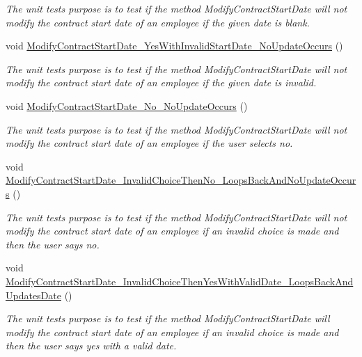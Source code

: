 \begin{DoxyCompactItemize}
\begin{DoxyCompactList}\small\item\em The unit test\textquotesingle{}s purpose is to test if the method Modify\+Contract\+Start\+Date will not modify the contract start date of an employee if the given date is blank. \end{DoxyCompactList}\item 
void \hyperlink{class_the_company_1_1_tests_1_1_modify_employee_tests_ab9b457db33dc409bbb42b0b6e9b6025c}{Modify\+Contract\+Start\+Date\+\_\+\+Yes\+With\+Invalid\+Start\+Date\+\_\+\+No\+Update\+Occurs} ()
\begin{DoxyCompactList}\small\item\em The unit test\textquotesingle{}s purpose is to test if the method Modify\+Contract\+Start\+Date will not modify the contract start date of an employee if the given date is invalid. \end{DoxyCompactList}\item 
void \hyperlink{class_the_company_1_1_tests_1_1_modify_employee_tests_a3c10f239eaacebbcdbc8eb629ef14f58}{Modify\+Contract\+Start\+Date\+\_\+\+No\+\_\+\+No\+Update\+Occurs} ()
\begin{DoxyCompactList}\small\item\em The unit test\textquotesingle{}s purpose is to test if the method Modify\+Contract\+Start\+Date will not modify the contract start date of an employee if the user selects no. \end{DoxyCompactList}\item 
void \hyperlink{class_the_company_1_1_tests_1_1_modify_employee_tests_a1415fc07af5306a018aa81442f567551}{Modify\+Contract\+Start\+Date\+\_\+\+Invalid\+Choice\+Then\+No\+\_\+\+Loops\+Back\+And\+No\+Update\+Occurs} ()
\begin{DoxyCompactList}\small\item\em The unit test\textquotesingle{}s purpose is to test if the method Modify\+Contract\+Start\+Date will not modify the contract start date of an employee if an invalid choice is made and then the user says no. \end{DoxyCompactList}\item 
void \hyperlink{class_the_company_1_1_tests_1_1_modify_employee_tests_a6f009c1c2b85796d2f0ebc19cc207d60}{Modify\+Contract\+Start\+Date\+\_\+\+Invalid\+Choice\+Then\+Yes\+With\+Valid\+Date\+\_\+\+Loops\+Back\+And\+Updates\+Date} ()
\begin{DoxyCompactList}\small\item\em The unit test\textquotesingle{}s purpose is to test if the method Modify\+Contract\+Start\+Date will modify the contract start date of an employee if an invalid choice is made and then the user says yes with a valid date. \end{DoxyCompactList}\item 

\end{DoxyCompactItemize}
